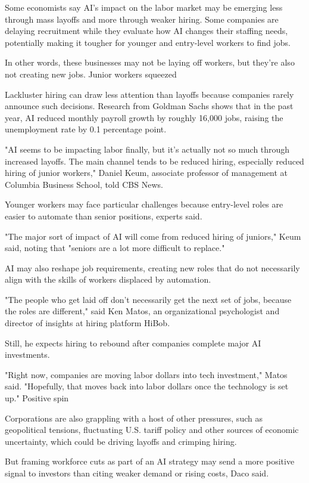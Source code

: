 Some economists say AI's impact on the labor market may be emerging less through mass layoffs and more through weaker hiring. Some companies are delaying recruitment while they evaluate how AI changes their staffing needs, potentially making it tougher for younger and entry-level workers to find jobs.

In other words, these businesses may not be laying off workers, but they're also not creating new jobs.
Junior workers squeezed

Lackluster hiring can draw less attention than layoffs because companies rarely announce such decisions. Research from Goldman Sachs shows that in the past year, AI reduced monthly payroll growth by roughly 16,000 jobs, raising the unemployment rate by 0.1 percentage point.

"AI seems to be impacting labor finally, but it's actually not so much through increased layoffs. The main channel tends to be reduced hiring, especially reduced hiring of junior workers," Daniel Keum, associate professor of management at Columbia Business School, told CBS News.

Younger workers may face particular challenges because entry-level roles are easier to automate than senior positions, experts said.

"The major sort of impact of AI will come from reduced hiring of juniors," Keum said, noting that "seniors are a lot more difficult to replace."

AI may also reshape job requirements, creating new roles that do not necessarily align with the skills of workers displaced by automation.

"The people who get laid off don't necessarily get the next set of jobs, because the roles are different," said Ken Matos, an organizational psychologist and director of insights at hiring platform HiBob.

Still, he expects hiring to rebound after companies complete major AI investments.

"Right now, companies are moving labor dollars into tech investment," Matos said. "Hopefully, that moves back into labor dollars once the technology is set up."
Positive spin

Corporations are also grappling with a host of other pressures, such as geopolitical tensions, fluctuating U.S. tariff policy and other sources of economic uncertainty, which could be driving layoffs and crimping hiring.

But framing workforce cuts as part of an AI strategy may send a more positive signal to investors than citing weaker demand or rising costs, Daco said.

